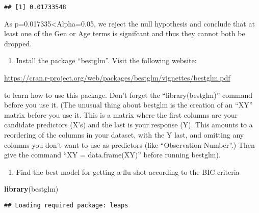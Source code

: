 \documentclass[]{article}
\newenvironment{Shaded}{\begin{snugshade}}{\end{snugshade}}
\newcommand{\KeywordTok}[1]{\textcolor[rgb]{0.13,0.29,0.53}{\textbf{#1}}}
\newcommand{\DataTypeTok}[1]{\textcolor[rgb]{0.13,0.29,0.53}{#1}}
\newcommand{\StringTok}[1]{\textcolor[rgb]{0.31,0.60,0.02}{#1}}
\newcommand{\OperatorTok}[1]{\textcolor[rgb]{0.81,0.36,0.00}{\textbf{#1}}}
\newcommand{\NormalTok}[1]{#1}
\providecommand{\tightlist}{%
  \setlength{\itemsep}{0pt}\setlength{\parskip}{0pt}}
\begin{document}
\begin{verbatim}
## [1] 0.01733548
\end{verbatim}

As p=0.017335\textless{}Alpha=0.05, we reject the null hypothesis and
conclude that at least one of the Gen or Age terms is signifcant and
thus they cannot both be dropped.

\begin{enumerate}
\def\labelenumi{\Alph{enumi})}
\setcounter{enumi}{6}
\tightlist
\item
  Install the package ``bestglm''. Visit the following website:
\end{enumerate}

\url{https://cran.r-project.org/web/packages/bestglm/vignettes/bestglm.pdf}

to learn how to use this package. Don't forget the ``library(bestglm)''
command before you use it. (The unusual thing about bestglm is the
creation of an ``XY'' matrix before you use it. This is a matrix where
the first columns are your candidate predictors (X's) and the last is
your response (Y). This amounts to a reordering of the columns in your
dataset, with the Y last, and omitting any columns you don't want to use
as predictors (like ``Observation Number''.) Then give the command ``XY
= data.frame(XY)'' before running bestglm).

\begin{enumerate}
\def\labelenumi{\roman{enumi})}
\tightlist
\item
  Find the best model for getting a flu shot according to the BIC
  criteria
\end{enumerate}

\begin{Shaded}
\begin{Highlighting}[]
\KeywordTok{library}\NormalTok{(bestglm)}
\end{Highlighting}
\end{Shaded}

\begin{verbatim}
## Loading required package: leaps
\end{verbatim}

\begin{Shaded}
\end{Shaded}
\end{document}
